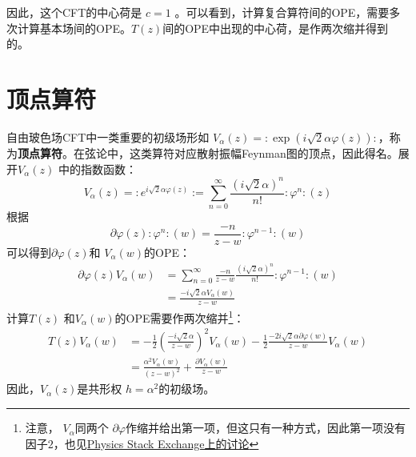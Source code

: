 因此，这个CFT的中心荷是 $c=1$ 。可以看到，计算复合算符间的OPE，需要多次计算基本场间的OPE。$ T(z) $间的OPE中出现的中心荷，是作两次缩并得到的。

\section{顶点算符}
自由玻色场CFT中一类重要的初级场形如 $V_{\alpha}(z)=: \exp (i \sqrt{2} \alpha \varphi(z)): $，称为\textbf{顶点算符}。在弦论中，这类算符对应散射振幅Feynman图的顶点，因此得名。展开$ V_\alpha(z)$ 中的指数函数：
\begin{equation}
	V_{\alpha}(z)=: e^{i \sqrt{2} \alpha \varphi(z)}:=\sum_{n=0}^{\infty} \frac{(i \sqrt{2} \alpha)^{n}}{n !}: \varphi^{n}:(z)
\end{equation}
根据
\begin{equation}
	\partial \varphi(z): \varphi^{n}:(w)=\frac{-n}{z-w}: \varphi^{n-1}:(w)
\end{equation}
可以得到$ \partial \varphi(z) $和 $V_\alpha(w) $的OPE：
\begin{equation}
\begin{aligned} \partial \varphi(z) V_{\alpha}(w) &=\sum_{n=0}^{\infty} \frac{-n}{z-w} \frac{(i \sqrt{2} \alpha)^{n}}{n !}: \varphi^{n-1}:(w) \\ &=\frac{-i \sqrt{2} \alpha V_{\alpha}(w)}{z-w} \end{aligned}
\end{equation}
计算$T(z)$ 和$ V_\alpha(w) $的OPE需要作两次缩并\footnote{注意， $V_\alpha $同两个 $\partial \varphi $作缩并给出第一项，但这只有一种方式，因此第一项没有因子$2$，也见\href{https://physics.stackexchange.com/questions/398365/ope-double-contractions-between-t-and-eikx}{Physics Stack Exchange上的讨论}}：
\begin{equation}
	\begin{aligned} T(z) V_{\alpha}(w) &=-\frac{1}{2}\left(\frac{-i \sqrt{2} \alpha}{z-w}\right)^2 V_{\alpha}(w)-\frac{1}{2} \frac{-2 i \sqrt{2} \alpha \partial \varphi(w)}{z-w} V_{\alpha}(w) \\ &=\frac{\alpha^{2} V_{\alpha}(w)}{(z-w)^{2}}+\frac{\partial V_{\alpha}(w)}{z-w} \end{aligned}
\end{equation}
因此，$V_\alpha(z) $是共形权 $h=\alpha^2 $的初级场。

